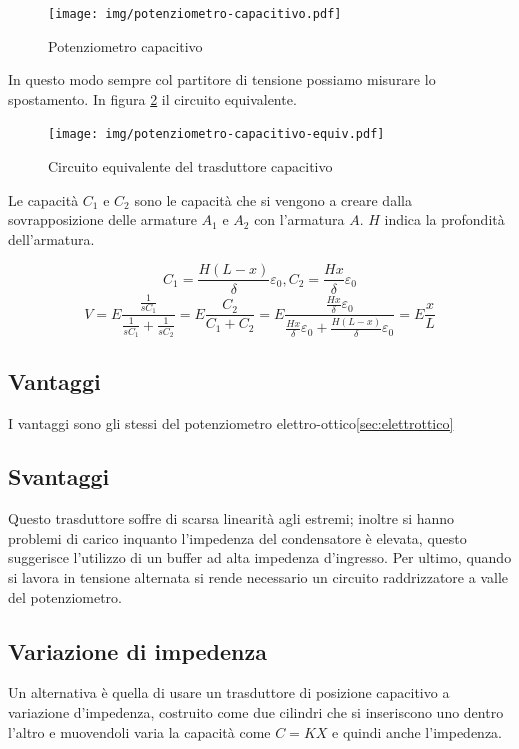 \begin{figure}[htbp]
	\centering
	\texttt{[image: img/potenziometro-capacitivo.pdf]}
	\caption{Potenziometro capacitivo\label{fig:potcapacitivo}}
\end{figure}

In questo modo sempre col partitore di tensione possiamo misurare lo
spostamento. In figura \ref{fig:potcapacitivoequiv} il circuito
equivalente.

\begin{figure}[htbp]
	\centering
	\texttt{[image: img/potenziometro-capacitivo-equiv.pdf]}
	\caption{Circuito equivalente
del trasduttore capacitivo\label{fig:potcapacitivoequiv}}
\end{figure}

Le capacità $C_1$ e $C_2$ sono le capacità che si vengono a creare
dalla sovrapposizione delle armature $A_1$ e $A_2$ con l'armatura $A$.
$H$ indica la profondità dell'armatura.

	\[
	C_1=\frac{H (L-x)}{\delta}\varepsilon_0,
	C_2 =\frac{Hx}{\delta}\varepsilon_0
	\]
	\[
	V=E\frac{\frac{1}{sC_1}}{\frac{1}{sC_1}+\frac{1}{sC_2}}
	 =E\frac{C_2}{C_1+C_2}
	 =E\frac{\frac{Hx}{\delta}\varepsilon_0}
		{\frac{Hx}{\delta}\varepsilon_0+
				\frac{H(L-x)}{\delta}\varepsilon_0}
	 =E\frac{x}{L}
	\]

\subsection{Vantaggi}
I vantaggi sono gli stessi del potenziometro
elettro-ottico\ref{sec:elettrottico}
\subsection{Svantaggi}
Questo trasduttore soffre di scarsa linearità agli estremi; inoltre
si hanno problemi di carico inquanto l'impedenza del condensatore è
elevata, questo suggerisce l'utilizzo di un buffer ad alta
impedenza d'ingresso. Per ultimo, quando si lavora in
tensione alternata si rende necessario un circuito raddrizzatore a
valle del potenziometro.

\subsection{Variazione di impedenza}
Un alternativa è quella di usare un trasduttore di posizione
capacitivo a variazione d'impedenza, costruito come due cilindri che
si inseriscono uno dentro l'altro e muovendoli varia la capacità come
$C=KX$ e quindi anche l'impedenza.

